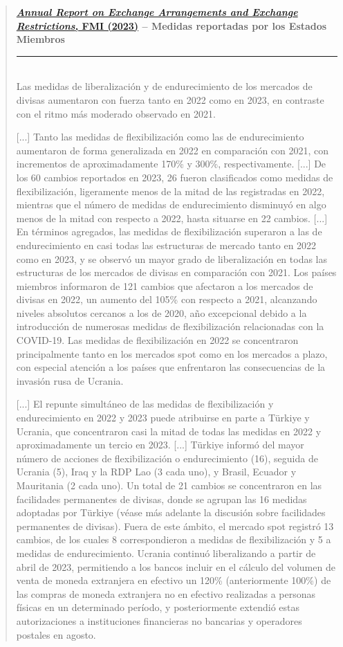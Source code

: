 \documentclass[10pt,a4paper]{article}
\newenvironment{specialblock}[1]{%
      \begin{quote} %
      \small %
      \noindent\textbf{#1}\\[-0.3em] %
      \rule{\linewidth}{0.4pt}\\[0.6em]}{
      \end{quote}}
\begin{document}
\begin{specialblock}{\href{https://www.imf.org/en/publications/annual-report-on-exchange-arrangements-and-exchange-restrictions/issues/2024/12/19/annual-report-on-exchange-arrangements-and-exchange-restrictions-2023-541890}{\textit{Annual Report on Exchange Arrangements and Exchange Restrictions}, FMI (2023)} -- Medidas reportadas por los Estados Miembros}
    Las medidas de liberalización y de endurecimiento de los mercados de divisas aumentaron con fuerza tanto en 2022 como en 2023, en contraste con el ritmo más moderado observado en 2021. 
    
    [...] Tanto las medidas de flexibilización como las de endurecimiento aumentaron de forma generalizada en 2022 en comparación con 2021, con incrementos de aproximadamente 170\% y 300\%, respectivamente.  [...] De los 60 cambios reportados en 2023, 26 fueron clasificados como medidas de flexibilización, ligeramente menos de la mitad de las registradas en 2022, mientras que el número de medidas de endurecimiento disminuyó en algo menos de la mitad con respecto a 2022, hasta situarse en 22 cambios. [...] En términos agregados, las medidas de flexibilización superaron a las de endurecimiento en casi todas las estructuras de mercado tanto en 2022 como en 2023, y se observó un mayor grado de liberalización en todas las estructuras de los mercados de divisas en comparación con 2021. Los países miembros informaron de 121 cambios que afectaron a los mercados de divisas en 2022, un aumento del 105\% con respecto a 2021, alcanzando niveles absolutos cercanos a los de 2020, año excepcional debido a la introducción de numerosas medidas de flexibilización relacionadas con la COVID-19.  Las medidas de flexibilización en 2022 se concentraron principalmente tanto en los mercados spot como en los mercados a plazo, con especial atención a los países que enfrentaron las consecuencias de la invasión rusa de Ucrania. 

    [...] El repunte simultáneo de las medidas de flexibilización y endurecimiento en 2022 y 2023 puede atribuirse en parte a Türkiye y Ucrania, que concentraron casi la mitad de todas las medidas en 2022 y aproximadamente un tercio en 2023. [...] Türkiye informó del mayor número de acciones de flexibilización o endurecimiento (16), seguida de Ucrania (5), Iraq y la RDP Lao (3 cada uno), y Brasil, Ecuador y Mauritania (2 cada uno). Un total de 21 cambios se concentraron en las facilidades permanentes de divisas, donde se agrupan las 16 medidas adoptadas por Türkiye (véase más adelante la discusión sobre facilidades permanentes de divisas). Fuera de este ámbito, el mercado spot registró 13 cambios, de los cuales 8 correspondieron a medidas de flexibilización y 5 a medidas de endurecimiento. Ucrania continuó liberalizando a partir de abril de 2023, permitiendo a los bancos incluir en el cálculo del volumen de venta de moneda extranjera en efectivo un 120\% (anteriormente 100\%) de las compras de moneda extranjera no en efectivo realizadas a personas físicas en un determinado período, y posteriormente extendió estas autorizaciones a instituciones financieras no bancarias y operadores postales en agosto. 


\end{specialblock}
\end{document}

